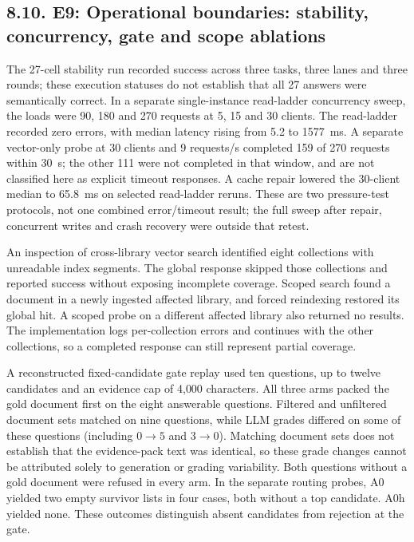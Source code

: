 \subsection{8.10. E9: Operational boundaries: stability, concurrency, gate and
scope ablations}

The 27-cell stability run recorded success across three tasks, three lanes
and three rounds; these execution statuses do not establish that all 27
answers were semantically correct. In a separate
single-instance read-ladder concurrency sweep, the loads were 90, 180 and
270 requests at 5, 15 and 30 clients. The read-ladder recorded zero errors,
with median latency rising from 5.2 to 1577~ms. A separate vector-only
probe at 30 clients and 9 requests/s completed 159 of 270 requests within
30~s; the other 111 were not completed in that window, and are not
classified here as explicit timeout responses. A cache repair lowered the
30-client median to 65.8~ms on selected read-ladder reruns. These are two
pressure-test protocols, not one combined error/timeout result; the full
sweep after repair, concurrent writes and crash recovery were outside that
retest.

An inspection of cross-library vector search identified eight collections
with unreadable index segments. The global response skipped those
collections and reported success without exposing incomplete coverage.
Scoped search found a document in a newly ingested affected library,
and forced reindexing restored its global hit. A scoped probe on a
different affected library also returned no results. The implementation
logs per-collection errors and continues with the other collections, so
a completed response can still represent partial coverage.

A reconstructed fixed-candidate gate replay used ten questions, up to twelve
candidates and an evidence cap of 4{,}000 characters. All three arms
packed the gold document first on the eight answerable questions.
Filtered and unfiltered document sets matched on nine questions, while
LLM grades differed on some of these questions (including $0\to5$ and
$3\to0$). Matching document sets does not establish that the evidence-pack
text was identical, so these grade changes cannot be attributed solely to
generation or grading variability. Both questions without a gold document
were refused in every
arm. In the separate routing probes, A0 yielded two empty survivor
lists in four cases, both without a top candidate. A0h yielded none.
These outcomes distinguish absent candidates from rejection at the gate.

